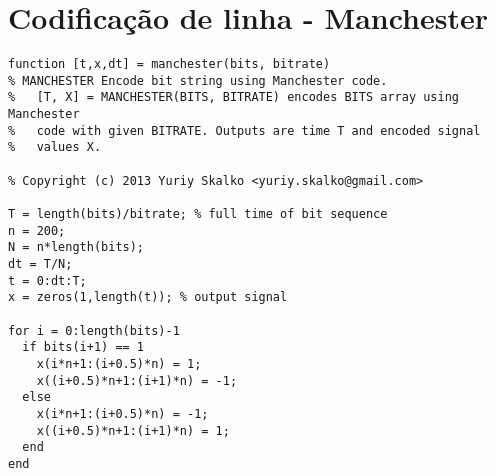 \section{Codificação de linha - Manchester}
\begin{lstlisting}
function [t,x,dt] = manchester(bits, bitrate)
% MANCHESTER Encode bit string using Manchester code.
%   [T, X] = MANCHESTER(BITS, BITRATE) encodes BITS array using Manchester
%   code with given BITRATE. Outputs are time T and encoded signal
%   values X.

% Copyright (c) 2013 Yuriy Skalko <yuriy.skalko@gmail.com>

T = length(bits)/bitrate; % full time of bit sequence
n = 200;
N = n*length(bits);
dt = T/N;
t = 0:dt:T;
x = zeros(1,length(t)); % output signal

for i = 0:length(bits)-1
  if bits(i+1) == 1
    x(i*n+1:(i+0.5)*n) = 1;
    x((i+0.5)*n+1:(i+1)*n) = -1;
  else
    x(i*n+1:(i+0.5)*n) = -1;
    x((i+0.5)*n+1:(i+1)*n) = 1;
  end
end
\end{lstlisting}

